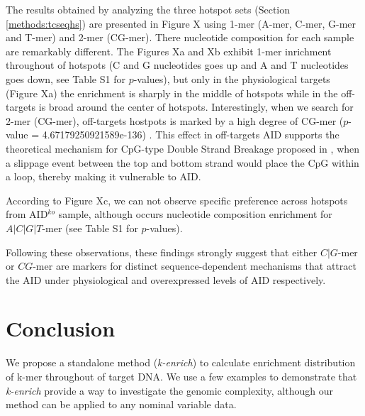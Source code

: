 \documentclass{bioinfo}
\begin{document}
The results obtained by analyzing the three hotspot sets (Section
\ref{methods:tcseqhs}) are presented in Figure X using 1-mer (A-mer,
C-mer, G-mer and T-mer) and 2-mer (CG-mer). There nucleotide composition
for each sample are remarkably different. The Figures Xa and Xb exhibit 1-mer inrichment throughout of hotspots (C and G nucleotides goes up and A and T nucleotides goes down, see Table S1 for $p$-values), but only in the physiological targets (Figure Xa) the enrichment is sharply in the middle of hotspots while in the off-targets is broad around the center of hotspots. Interestingly, when we search for 2-mer (CG-mer), off-targets hostpots is marked by a high degree of CG-mer ($p$-value = 4.67179250921589e-136) . This effect in off-targets AID supports the theoretical mechanism for CpG-type Double Strand Breakage proposed in \cite{pmid19070581}, when a
slippage event between the top and bottom strand would place the CpG
within a loop, thereby making it vulnerable to AID.

According to Figure Xc, we can not observe specific preference
across hotspots from AID$^{ko}$ sample, although occurs nucleotide
composition enrichment for $A|C|G|T$-mer (see Table S1 for
$p$-values).

Following these observations, these findings strongly suggest that
either $C|G$-mer or $CG$-mer are markers for distinct
sequence-dependent mechanisms that attract the AID under physiological
and overexpressed levels of AID respectively.

\section{Conclusion}
We propose a standalone method ({\it k-enrich}) to calculate
enrichment distribution of k-mer throughout of target DNA. We use a
few examples to demonstrate that {\it k-enrich} provide a way to
investigate the genomic complexity, although our method can be applied
to any nominal variable data.



\scriptsize{
   
\normalsize
}
\end{document}

